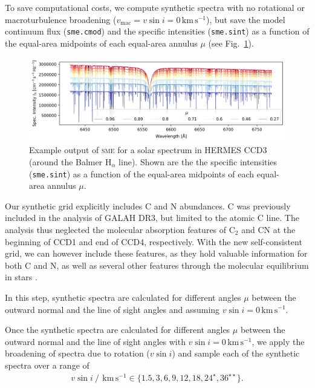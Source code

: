 \documentclass[
  journal=pasa,
  manuscript=research-paper, %
  year=2021,
  volume=37
]{cup-journal}
\newcommand{\vsini}{$v \sin i$\xspace}
\newcommand{\sme}{\textsc{sme}\xspace}
\newcommand{\kms}{\,\mathrm{km\,s^{-1}}}	%
\begin{document}
To save computational costs, we compute synthetic spectra with no rotational or macroturbulence broadening ($v_\text{mac} = v\sin i = 0\kms$), but save the model continuum flux (\texttt{sme.cmod}) and the specific intensities (\texttt{sme.sint}) as a function of the equal-area midpoints of each equal-area annulus $\mu$ (see Fig.~\ref{fig:sme_mu_output}).

\begin{figure}[hbt!]
 \centering
 \includegraphics[width=\textwidth]{figures/solar_twin_specific_intensity.png}
 \caption{Example output of \sme for a solar spectrum in HERMES CCD3 (around the Balmer $\mathrm{H}_\alpha$ line). Shown are the the specific intensities (\texttt{sme.sint}) as a function of the equal-area midpoints of each equal-area annulus $\mu$.}
 \label{fig:sme_mu_output}
\end{figure}

Our synthetic grid explicitly includes C and N abundances. C was previously included in the analysis of GALAH DR3, but limited to the atomic C line. The analysis thus neglected the molecular absorption features of $\mathrm{C_2}$ and CN at the beginning of CCD1 and end of CCD4, respectively. With the new self-consistent grid, we can however include these features, as they hold valuable information for both C and N, as well as several other features through the molecular equilibrium in stars \citep[see e.g.][]{Ting2018}.

In this step, synthetic spectra are calculated for different angles $\mu$ between the outward normal and the line of sight angles and assuming $v \sin i = 0\kms$. 

Once the synthetic spectra are calculated for different angles $\mu$ between the outward normal and the line of sight angles with $v \sin i = 0\kms$, we apply the broadening of spectra due to rotation (\vsini) and sample each of the synthetic spectra over a range of
\begin{align} \label{eq:vsini}
    v \sin i~/~\kms \in \{ 1.5, 3, 6, 9, 12, 18, 24^\star, 36^{\star \star}\}.
\end{align}
\end{document}
